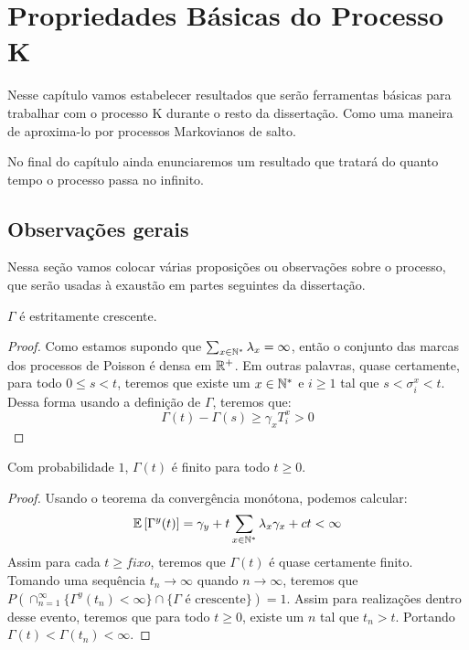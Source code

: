 \chapter{Propriedades Básicas do Processo K}
\label{cap:propriedades}

Nesse capítulo vamos estabelecer resultados que serão ferramentas
básicas para trabalhar com o processo K durante o resto da
dissertação. Como uma maneira de aproxima-lo por processos Markovianos
de salto.

No final do capítulo ainda enunciaremos um resultado que tratará do
quanto tempo o processo passa no infinito.


\section{Observações gerais}
\label{sec:observacoes}

Nessa seção vamos colocar várias proposições ou observações sobre o
processo, que serão usadas à exaustão em partes seguintes da
dissertação.

\begin{proposicao}
  \label{prop:gamma-crescente}
  $\Gamma$ é \qc estritamente crescente.
\end{proposicao}
\begin{proof}
  Como estamos supondo que $\sum_{x \in {\mathbb{N^*}}} \lambda_x = \infty$,
  então o conjunto das marcas dos processos de Poisson é \qc densa em
  ${\mathbb{R}}^+$. Em outras palavras, quase certamente, para todo $0 \leq s <
  t$, teremos que existe um $x \in {\mathbb{N^*}}$ e $i \geq 1$ tal que $s <
  \sigma^x_i < t$. Dessa forma usando a definição de $\Gamma$, teremos
  que:
  \begin{displaymath}
    \Gamma(t) - \Gamma(s) \geq \gamma_x T^x_i > 0
  \end{displaymath}
\end{proof}

\begin{proposicao}
  \label{prop:gamma-finita}
  Com probabilidade $1$, $\Gamma(t)$ é finito para todo $t \geq 0$.
\end{proposicao}
\begin{proof}
  Usando o teorema da convergência monótona, podemos calcular:
  \begin{displaymath}
    {\mathbb{E}} \left[\Gamma^y(t) \right] = \gamma_y + t \sum_{x \in {\mathbb{N^*}}}
    \lambda_x \gamma_x + ct < \infty
  \end{displaymath}
  Assim para cada $t \geq fixo$, teremos que $\Gamma(t)$ é quase
  certamente finito. Tomando uma sequência $t_n \to \infty$ quando $n
  \to \infty$, teremos que $P(\cap_{n = 1}^{\infty} \{ \Gamma^y (t_n)
  < \infty \} \cap \{ \Gamma \textrm{ é crescente}\}) = 1$. Assim para
  realizações dentro desse evento, teremos que para todo $t \geq 0$,
  existe um $n$ tal que $t_n > t$. Portando $\Gamma(t) < \Gamma(t_n) <
  \infty$.
\end{proof}

